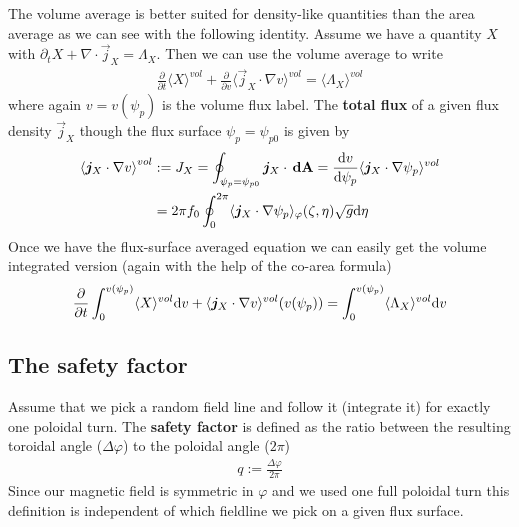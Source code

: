 The volume average is better suited for density-like quantities
than the area average as we can see with the following identity.
Assume we have a quantity $X$ with $\partial_t X + \nabla \cdot \vec j_X = \Lambda_X$. Then we can use the volume average to write
\begin{align}
\frac{\partial}{\partial t} \langle X \rangle^{vol} + \frac{\partial}{
  \partial v} \langle \vec j_X\cdot \nabla v\rangle^{vol}  = \langle \Lambda_X\rangle^{vol}
\label{eq:fsa_balance}
\end{align}
where again $v=v(\psi_p)$ is the volume flux label.
The {\bf total flux} of a given flux density $\vec j_X$ though the
flux surface $\psi_p = \psi_{p0}$ is given by
\begin{align}
\left\langle{\boldsymbol{j}}_X\cdot\nabla v\right\rangle^{vol} &:= J_X=\oint_{\psi_p=\psi_{p0}} {\boldsymbol{j}}_X\cdot {\boldsymbol{\,\mathrm{dA}}} =
 \frac{\mathrm{d} v}{\mathrm{d}\psi_p} \langle {\boldsymbol{j}}_X\cdot\nabla\psi_p \rangle^{vol}\\
 &=
   2\pi f_0 \oint_0^{2\pi} \langle {\boldsymbol{j}}_X\cdot\nabla\psi_p\rangle_\varphi(\zeta,\eta) \sqrt{g}\mathrm{d}\eta
\label{eq:total_flux}
\end{align}
Once we have the flux-surface averaged equation we can easily get the volume integrated version (again with the help of the co-area formula)
\begin{align}
\frac{\partial}{\partial t} \int_0^{v(\psi_p)}\langle X \rangle^{vol} \mathrm{d} v 
+ \langle {\boldsymbol{j}}_X\cdot \nabla v\rangle^{vol}(v(\psi_p))  = \int_0^{v(\psi_p)}\langle \Lambda_X\rangle^{vol}\mathrm{d} v
\label{eq:integral_balance}
\end{align}

\subsection{The safety factor}
Assume that we pick a random field line and follow it (integrate it) for exactly one
poloidal turn. The {\bf safety factor} is defined as the ratio between
the resulting toroidal angle ($\Delta\varphi$) to the poloidal angle ($2\pi$)
\begin{align}
q := \frac{\Delta\varphi}{2\pi}
\label{}
\end{align}
Since our magnetic field is symmetric in $\varphi$ and we used one
full poloidal turn this definition is independent of which
fieldline we pick on a given flux surface.

